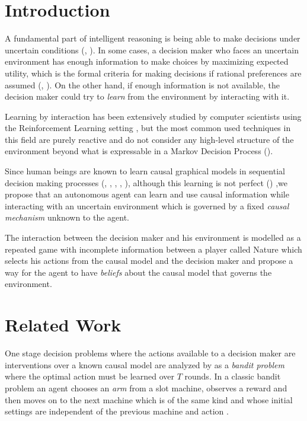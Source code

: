 \documentclass{article}
\begin{document}
\section{Introduction}
A fundamental part of intelligent reasoning  is being able to make decisions under uncertain conditions (\cite{lake2017building}, \cite{danks2014unifying}). In some cases, a decision maker who faces an uncertain environment has enough information to make choices by maximizing expected utility, which is the formal criteria for making decisions if rational preferences are assumed (\cite{bernardo2000bayesian}, \cite{gilboa2009decision}). On the other hand, if enough information is not available, the decision maker could try to \textit{learn} from the environment by interacting with it.

Learning by interaction has been extensively studied by computer scientists using the Reinforcement Learning  setting \cite{sutton1998reinforcement}, but the most common used techniques  in this field are purely reactive and do not consider any high-level structure of the environment beyond what is expressable in a Markov Decision Process (\cite{garnelo2016towards}).

Since human beings are known to learn causal graphical models in sequential decision making processes (\cite{sloman2006causal}, \cite{nichols2007decision}, \cite{meder2010observing}, \cite{hagmayer2013repeated}, \cite{danks2014unifying}), although this learning is not perfect (\cite{rottman2014reasoning}) ,we propose that an autonomous agent can learn and use causal information while interacting with an uncertain environment which is governed by a fixed \textit{causal mechanism} unknown to the agent.  

The interaction between the decision maker and his environment is modelled as a repeated game with incomplete information between a player called Nature which selects his actions from the causal model and the decision maker and propose a way for the agent to have \textit{beliefs} about the causal model that governs the environment.

\section{Related Work}
One stage decision problems where the actions available to a decision maker are interventions over a known causal model are analyzed by \cite{lattimoreNIPS2016} as a \textit{bandit problem} where the optimal action must be learned over $T$ rounds. In a classic bandit problem an agent chooses an \textit{arm} from a slot machine, observes a reward and then moves on to the next machine which is of the same kind and whose initial settings are independent of the previous machine and action \cite{sutton1998reinforcement}.
\end{document}
